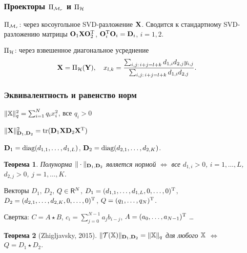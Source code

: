\documentclass[unicode, notheorems]{beamer}
\newtheorem{theorem}{Теорема}
\begin{document}
\begin{frame}
	\frametitle{Проекторы $\Pi_{\mathcal{M}_r}$ и $\Pi_{\mathcal{H}}$}
	
	$\Pi_{\mathcal{M}_r}$: через косоугольное SVD-разложение $\mathbf{X}$. Сводится к стандартному SVD-разложению матрицы $\mathbf{O}_1 \mathbf{X} \mathbf{O}_2^{\mathrm{T}}$, $\mathbf{O}_i^{\mathrm{T}} \mathbf{O}_i = \mathbf{D}_i$, $i = 1, 2.$
		
	\vspace{0.6cm}
	$\Pi_{\mathcal{H}}$: через взвешенное диагональное усреднение
	\begin{equation*}
	\mathbf{X} = \Pi_{\mathcal{H}}(\mathbf{Y}), \quad x_{l,k} = \frac{\sum_{i,j:\, i+j=l+k} d_{1, i} d_{2, j} y_{i,j}}{\sum_{i,j:\, i+j=l+k} d_{1, i} d_{2, j}}.
	\end{equation*}
\end{frame}


\begin{frame}
	\frametitle{Эквивалентность и равенство норм}
    $\|\mathbb{X}\|_q^2 = \sum_{i = 1}^N q_i x_i^2$, все $q_i > 0$
    
    $\|\mathbf{X}\|^2_{\mathbf{D}_1, \mathbf{D}_2} = \text{tr}(\mathbf{D}_1 \mathbf{X} \mathbf{D}_2 \mathbf{X}^{\mathrm{T}})$
    
    $\mathbf{D}_1 = \text{diag}(d_{1, 1}, \ldots, d_{1, L})$, $\mathbf{D}_2 = \text{diag}(d_{2, 1}, \ldots, d_{2, K})$.
	
	\begin{theorem}
		Полунорма $\|\cdot\|_{\mathbf{D}_1, \mathbf{D}_2}$ является нормой $\Leftrightarrow$ все $d_{1, i} > 0$, $i = 1, \ldots, L$, $d_{2, j} > 0$, $j = 1, \ldots, K$.
	\end{theorem}
	\vspace{0.2cm}
	Векторы $D_1$, $D_2$, $Q \in \mathsf{R}^N$, $D_1 = (d_{1, 1}, \ldots, d_{1, L}, 0, \ldots, 0)^{\mathrm{T}}$, $D_2 = (d_{2, 1}, \ldots, d_{2, K}, 0, \ldots, 0)^{\mathrm{T}}$, $Q = (q_1, \ldots, q_N)^{\mathrm{T}}$.
	
	Свертка: $C = A \star B$, $c_{i} = \sum_{j=0}^{N-1} a_{j} b_{i-j}$, $A = (a_0, \ldots, a_{N-1})^{\mathrm{T}}$ \ldots
	\begin{theorem}[Zhigljavsky, 2015]
		$\|\mathcal{T}(\mathbb{X})\|_{\mathbf{D}_1, \mathbf{D}_2} = \|\mathbb{X}\|_q$ для любого $\mathbb{X}$ $\Leftrightarrow$ $Q = D_1 \star D_2$.
	\end{theorem}
\end{frame}
\end{document}

